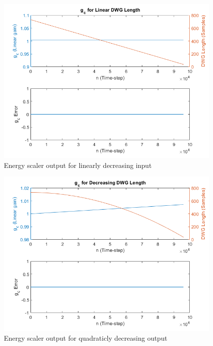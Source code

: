 \documentclass[../main.tex]{subfiles}
\begin{document}
\begin{figure}[h]
    \centering
    \includegraphics[scale=.65]{./images/plots/EnergyScalerLinearDecreasing.png}
    \caption{Energy scaler output for linearly decreasing input}
    \label{fig:EnergyScalerLinDec}
\end{figure}

\begin{figure}[h]
    \centering
    \includegraphics[scale=.65]{./images/plots/EnergyScalerQuadraticDecreasing.png}
    \caption{Energy scaler output for quadraticly decreasing output}
    \label{fig:EnergyScalerQuadDec}
\end{figure}

\clearpage
\end{document}
